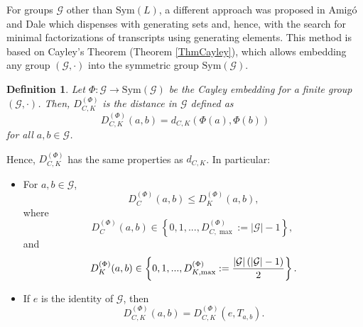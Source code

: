 \documentclass[%
 aip,
 amsmath,amssymb,
 reprint,%
]{revtex4-1}
\newtheorem{definition}[theorem]{Definition}
\begin{document}
For groups $\mathcal{G}$ other than $\mathrm{Sym}(L)$, a different approach
was proposed in Amig\'{o} and Dale \cite{Amigo2025} which dispenses with
generating sets and, hence, with the search for minimal factorizations of
transcripts using generating elements. This method is based on Cayley's
Theorem (Theorem \ref{ThmCayley}), which allows embedding any group $(%
\mathcal{G},\cdot )$ into the symmetric group $\mathrm{Sym}(\mathcal{G})$.

\begin{definition}
\label{DefDist(a,b)}Let $\Phi :\mathcal{G}\rightarrow \mathrm{Sym}(\mathcal{G%
})$ be the Cayley embedding for a finite group $(\mathcal{G},\cdot )$. Then, 
$D_{C,K}^{(\Phi )}$ is the distance in $\mathcal{G}$ defined as 
\begin{equation}
D_{C,K}^{(\Phi )}(a,b)=d_{C,K}(\Phi (a),\Phi (b))  \label{dist(a,b)}
\end{equation}%
for all $a,b\in \mathcal{G}$.
\end{definition}

Hence, $D_{C,K}^{(\Phi )}$ has the same properties as $d_{C,K}$. In particular:

\begin{itemize}
\item For $a,b\in \mathcal{G}$,%
\begin{equation}
D_{C}^{(\Phi )}(a,b)\leq D_{K}^{(\Phi )}(a,b),  \label{D_C<=D_K}
\end{equation}%
where 
\begin{equation}
D_{C}^{(\Phi )}(a,b)\in \left\{ 0,1,...,D_{C,\max }^{(\Phi )}:=\left\vert 
\mathcal{G}\right\vert -1\right\} ,\;  \label{DC max}
\end{equation}%
and 
\begin{equation}
D_{K}^{(\Phi )}(a,b)\in \left\{ 0,1,...,D_{K,\max }^{(\Phi )}:=\frac{%
\left\vert \mathcal{G}\right\vert (\left\vert \mathcal{G}\right\vert -1)}{2}%
\right\} .  \label{DK max}
\end{equation}

\item If $e$ is the identity of $\mathcal{G}$, then 
\begin{equation}
D_{C,K}^{(\Phi )}(a,b)=D_{C,K}^{(\Phi )}(e,T_{a,b}).  \label{Left inv D 2}
\end{equation}
\end{itemize}
\end{document}
